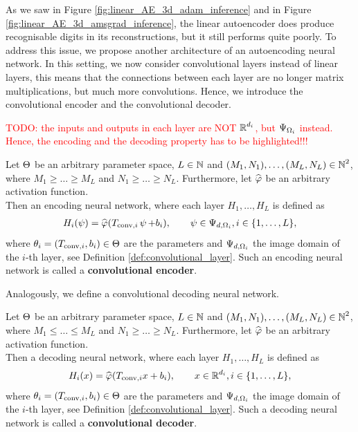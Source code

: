 As we saw in Figure \ref{fig:linear_AE_3d_adam_inference} and in Figure \ref{fig:linear_AE_3d_amsgrad_inference}, the linear autoencoder does produce recognisable digits in its reconstructions, but it still performs quite poorly. To address this issue, we propose another architecture of an autoencoding neural network. In this setting, we now consider convolutional layers instead of linear layers, this means that the connections between each layer are no longer matrix multiplications, but much more convolutions. Hence, we introduce the convolutional encoder and the convolutional decoder.


\textcolor{red}{TODO: the inputs and outputs in each layer are NOT $\operatorname{\mathbb{R}}^{d_i}$, but $\Psi_{\Omega_i}$ instead. Hence, the encoding and the decoding property has to be highlighted!!!}
\begin{definition}\label{def_convolutional_encoder}
Let $\operatorname{\Theta}$ be an arbitrary parameter space, $L\in \operatorname{\mathbb{N}}$ and $(M_1,N_1),\ldots,(M_L,N_L) \in \operatorname{\mathbb{N}}^2$, where $M_1\geq \ldots \geq M_L$ and $N_1\geq \ldots \geq N_L$. Furthermore, let $\widehat{\operatorname{\varphi}}$ be an arbitrary activation function.\\
Then an encoding neural network, where each layer $H_1,\ldots, H_L$ is defined as
\begin{align*}
H_i(\operatorname{\psi}) = \widehat{\operatorname{\varphi}}(T_{\text{conv}, i}\operatorname{\psi} + b_i), \qquad \operatorname{\psi} \in \Psi_{d,\Omega_i}, i \in \{1,\ldots, L\},
\end{align*}
where $\theta_i = (T_{\text{conv}, i}, b_i)\in\operatorname{\Theta}$ are the parameters and $\Psi_{d,\Omega_i}$ the image domain of the $i$-th layer, see Definition \ref{def:convolutional_layer}. Such an encoding neural network is called a \textbf{convolutional encoder}.
\end{definition}

Analogously, we define a convolutional decoding neural network.

\begin{definition}\label{def_convolutional_decoder}
Let $\operatorname{\Theta}$ be an arbitrary parameter space, $L\in \operatorname{\mathbb{N}}$ and $(M_1,N_1),\ldots,(M_L,N_L) \in \operatorname{\mathbb{N}}^2$, where $M_1\leq \ldots \leq M_L$ and $N_1\geq \ldots \geq N_L$. Furthermore, let $\widehat{\operatorname{\varphi}}$ be an arbitrary activation function.\\
Then a decoding neural network, where each layer $H_1,\ldots, H_L$ is defined as
\begin{align*}
H_i(x) = \widehat{\operatorname{\varphi}}(T_{\text{conv}, i}x + b_i), \qquad x \in \operatorname{\mathbb{R}}^{d_i}, i \in \{1,\ldots, L\},
\end{align*}
where $\theta_i = (T_{\text{conv}, i}, b_i)\in\operatorname{\Theta}$ are the parameters and $\Psi_{d,\Omega_i}$ the image domain of the $i$-th layer, see Definition \ref{def:convolutional_layer}. Such a decoding neural network is called a \textbf{convolutional decoder}.
\end{definition}


